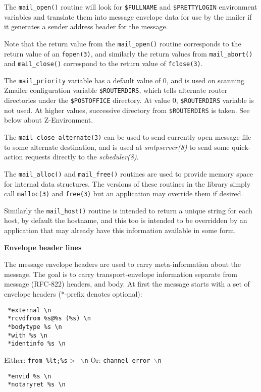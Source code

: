 The {\tt mail\_open()} routine will look for {\tt \$FULLNAME} 
and {\tt \$PRETTYLOGIN} environment variables and translate 
them into message envelope data for use by the mailer if it generates 
a sender address header for the message.

Note that the return value from the {\tt mail\_open()} routine
corresponds to the return value of an {\tt fopen(3)}, and similarly
the return values from {\tt mail\_abort()} and {\tt mail\_close()} 
correspond to the return value of {\tt fclose(3)}.

The {\tt mail\_priority} variable has a default value of 0, 
and is used on scanning Zmailer configuration variable 
{\tt \$ROUTERDIRS}, which tells alternate router directories 
under the {\tt \$POSTOFFICE} directory. At value 0, 
{\tt \$ROUTERDIRS} variable is not used. At higher values, 
successive directory from {\tt \$ROUTERDIRS} is taken. 
See below about Z-Environment.

The {\tt mail\_close\_alternate(3)} can be used to send currently
open message file to some alternate destination, and is
used at {\em smtpserver(8)\/} to send some quick-action requests
directly to the {\em scheduler(8)\/}.

The {\tt mail\_alloc()} and {\tt mail\_free()} routines are used 
to provide memory space for internal data structures. The versions
of these routines in the library simply call {\tt malloc(3)} and
{\tt free(3)} but an application may override them if desired.

Similarly the {\tt mail\_host()} routine is intended to return a
unique string for each host, by default the hostname, and
this too is intended to be overridden by an application
that may already have this information available in some form.

{\bf Envelope header lines}

The message envelope headers are used to carry meta-information
about the message.  The goal is to carry transport-envelope 
information separate from message (RFC-822) headers, and body.
At first the message starts with a set of envelope headers 
(*-prefix denotes optional):

\begin{tscreen}
\begin{verbatim}
 *external \n
 *rcvdfrom %s@%s (%s) \n
 *bodytype %s \n
 *with %s \n
 *identinfo %s \n
\end{verbatim}
\end{tscreen}

Either: {\tt from \%lt;\%s{\(>\)} \(\backslash\)n} Or: {\tt channel error \(\backslash\)n}
\begin{tscreen}
\begin{verbatim}
 *envid %s \n
 *notaryret %s \n
\end{verbatim}
\end{tscreen}


